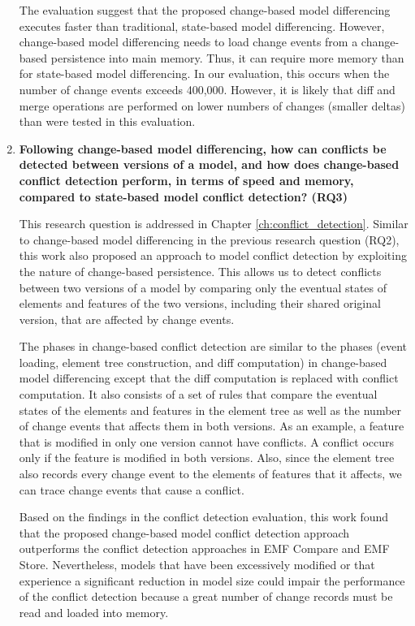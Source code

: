 \begin{enumerate}
  The evaluation suggest that the proposed change-based model differencing executes faster than traditional, state-based model differencing.
  However, change-based model differencing needs to load change events from a change-based persistence into main memory. Thus, it can require more memory than for state-based model differencing. In our evaluation, this occurs when the number of change events exceeds 400,000. However, it is likely that diff and merge operations are performed on lower numbers of changes (smaller deltas) than were tested in this evaluation.
  
  \item \textbf{Following change-based model differencing, how can conflicts be detected between versions of a model, and how does change-based conflict detection perform, in terms of speed and memory, compared to state-based model conflict detection? (RQ3)}
  
  This research question is addressed in Chapter \ref{ch:conflict_detection}. Similar to change-based model differencing in the previous research question (RQ2), this work also proposed an approach to model conflict detection by exploiting the nature of change-based persistence. This allows us to detect conflicts between two versions of a model by comparing only the eventual states of elements and features of the two versions, including their shared original version, that are affected by change events.
  
  The phases in change-based conflict detection are similar to the phases (event loading, element tree construction, and diff computation) in change-based model differencing except that the diff computation is replaced with conflict computation. It also consists of a set of rules that compare the eventual states of the elements and features in the element tree as well as the number of change events that affects them in both versions. As an example, a feature that is modified in only one version cannot have conflicts. A conflict occurs only if the feature is modified in both versions. Also, since the element tree also records every change event to the elements of features that it affects, we can trace change events that cause a conflict.
  
  Based on the findings in the conflict detection evaluation, this work found that the proposed change-based model conflict detection approach outperforms the conflict detection approaches in EMF Compare and EMF Store. Nevertheless, models that have been excessively modified or that experience a significant reduction in model size could impair the performance of the conflict detection because a great number of change records must be read and loaded into memory.
  
\end{enumerate}

